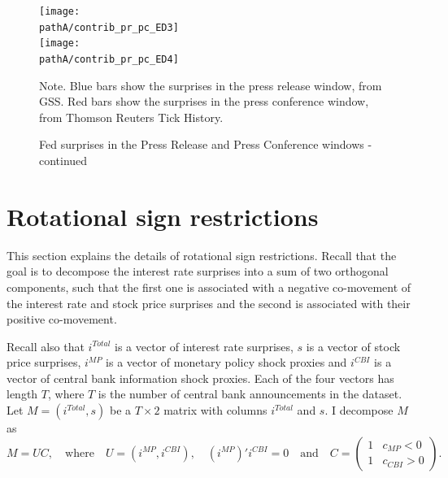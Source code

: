 \documentclass[a4paper,12pt]{article}
\newcommand{\pathA}{}
\begin{document}
\begin{figure}[p]
\caption{Fed surprises in the Press Release and Press Conference windows - continued}\label{fig: fed pr and pc 3}
\begin{center}
\texttt{[image: \\pathA/contrib\_pr\_pc\_ED3]}\\
\texttt{[image: \\pathA/contrib\_pr\_pc\_ED4]}\\
\end{center}
\footnotesize Note. Blue bars show the surprises in the press release window, from GSS. Red bars show the surprises in the press conference window, from Thomson Reuters Tick History.
\end{figure}


\clearpage

\section{Rotational sign restrictions}
This section explains the details of rotational sign restrictions. Recall that the goal is to decompose the interest rate surprises into a sum of two orthogonal
components, such that the first one is associated with a negative
co-movement of the interest rate and stock price surprises and the second is associated with their positive co-movement.

Recall also that $i^{Total}$ is a vector of interest rate surprises, $s$ is a vector of stock price surprises, $i^{MP}$ is a vector of monetary policy shock proxies and $i^{CBI}$ is a vector of central bank information shock proxies. Each of the four vectors has length $T$, where $T$ is the number of central bank announcements in the dataset. Let $M=(i^{Total},s)$ be a $T \times 2$ matrix with columns $i^{Total}$ and $s$.
I decompose $M$ as
\begin{equation} M = UC,\quad  \text{where}\quad U=\left(i^{MP},i^{CBI}\right), \quad (i^{MP})'i^{CBI}=0 \quad \text{and}\quad
C=\begin{pmatrix}1&c_{MP}<0\\1&c_{CBI}>0\end{pmatrix}.\label{eq: rotational sign restrictions}
\end{equation}
\end{document}
